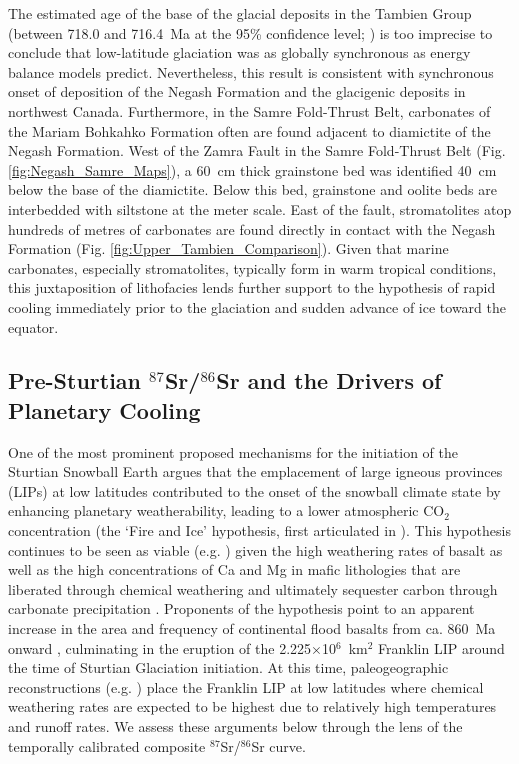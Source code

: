 \documentclass[11pt,letterpaper]{article}
\newcommand{\SrSr}{$^{87}$Sr/$^{86}$Sr\xspace}
\begin{document}
The estimated age of the base of the glacial deposits in the Tambien Group (between 718.0 and 716.4~Ma at the 95\% confidence level; \citealp{MacLennan2018a}) is too imprecise to conclude that low-latitude glaciation was as globally synchronous as energy balance models predict. Nevertheless, this result is consistent with synchronous onset of deposition of the Negash Formation and the glacigenic deposits in northwest Canada. Furthermore, in the Samre Fold-Thrust Belt, carbonates of the Mariam Bohkahko Formation often are found adjacent to diamictite of the Negash Formation. West of the Zamra Fault in the Samre Fold-Thrust Belt (Fig. \ref{fig:Negash_Samre_Maps}), a 60~cm thick grainstone bed was identified 40~cm below the base of the diamictite. Below this bed, grainstone and oolite beds are interbedded with siltstone at the meter scale. East of the fault, stromatolites atop hundreds of metres of carbonates are found directly in contact with the Negash Formation (Fig. \ref{fig:Upper_Tambien_Comparison}). Given that marine carbonates, especially stromatolites, typically form in warm tropical conditions, this juxtaposition of lithofacies lends further support to the hypothesis of rapid cooling immediately prior to the glaciation and sudden advance of ice toward the equator.

\subsection*{Pre-Sturtian \SrSr and the Drivers of Planetary Cooling}

One of the most prominent proposed mechanisms for the initiation of the Sturtian Snowball Earth argues that the emplacement of large igneous provinces (LIPs) at low latitudes contributed to the onset of the snowball climate state by enhancing planetary weatherability, leading to a lower atmospheric CO$_{2}$ concentration (the `Fire and Ice' hypothesis, first articulated in \citealp{Godderis2003a}). This hypothesis continues to be seen as viable (e.g. \citealp{Cox2016a}) given the high weathering rates of basalt as well as the high concentrations of Ca and Mg in mafic lithologies that are liberated through chemical weathering and ultimately sequester carbon through carbonate precipitation \citep{Dessert2001a}. Proponents of the hypothesis point to an apparent increase in the area and frequency of continental flood basalts from ca. 860~Ma onward \citep{Cox2016a}, culminating in the eruption of the 2.225$\times$10$^{6}$~km$^{2}$ Franklin LIP \citep{Ernst2008a} around the time of Sturtian Glaciation initiation. At this time, paleogeographic reconstructions (e.g. \citealp{Li2008a}) place the Franklin LIP at low latitudes where chemical weathering rates are expected to be highest due to relatively high temperatures and runoff rates. We assess these arguments below through the lens of the temporally calibrated composite \SrSr curve.
\end{document}
